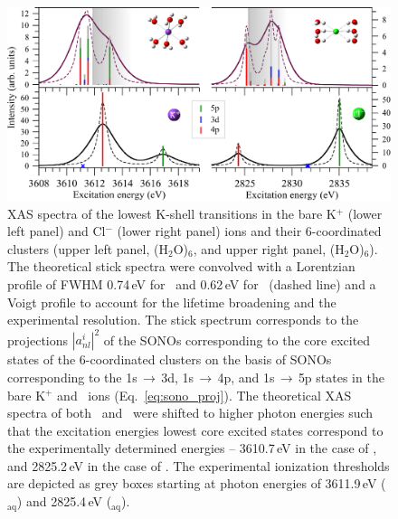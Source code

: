 \begin{figure}[h]
\centering
\includegraphics[scale=0.6]{figures/xas_spectra.eps}
\caption{
XAS spectra of the lowest K-shell transitions in the bare K$^{+}$ (lower left panel) and Cl$^{-}$ (lower right panel) ions and their 6-coordinated clusters (upper left panel, \ki(H$_2$O)$_6$, and upper right panel, \cli(H$_2$O)$_6$). The theoretical stick spectra were convolved with a Lorentzian profile of FWHM 0.74\,eV for \ki~and 0.62\,eV for \cli~(dashed line) and a Voigt profile to account for the lifetime broadening and the experimental resolution. The stick spectrum corresponds to the projections $|a_{nl}^{i}|^2$ of the SONOs corresponding to the core excited states of the 6-coordinated clusters on the basis of SONOs corresponding to the 1s$\,\rightarrow\,$3d, 1s$\,\rightarrow\,$4p, and 1s$\,\rightarrow\,$5p states in the bare K$^+$ and \cli~ions (Eq.\ \ref{eq:sono_proj}). The theoretical XAS spectra of both \ki~and \cli~were shifted to higher photon energies such that the excitation energies lowest core excited states correspond to the experimentally determined energies -- 3610.7\,eV in the case of \ki, and 2825.2\,eV in the case of \cli. The experimental ionization thresholds are depicted as grey boxes starting at photon energies of 3611.9\,eV (\ki$_{\text{aq}}$) and 2825.4\,eV (\cli$_{\text{aq}}$).}
\label{fg:xas_kcl}
\end{figure}


